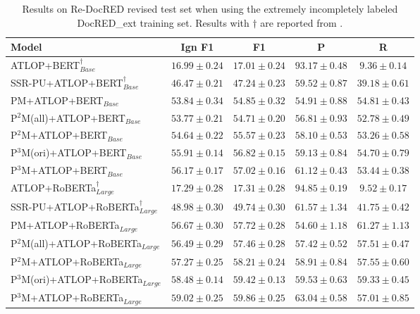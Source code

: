 \documentclass[11pt]{article}
\begin{document}
\begin{table}%
\centering
\small
\begin{tabular}{lcccc}
\toprule \textbf{Model} & Ign F1 & F1 & P & R \\
\midrule ATLOP+BERT$_{Base}^{\dagger}$ & $16.99 \pm 0.24$ & $17.01 \pm 0.24$ & $\mathbf{93.17} \pm \mathbf{0.48}$ & $9.36 \pm 0.14$ \\
SSR-PU+ATLOP+BERT$_{Base}^{\dagger}$ & $46.47 \pm 0.21$ & $47.24 \pm 0.23$ & $59.52 \pm 0.87$ & $39.18 \pm 0.61$ \\
PM+ATLOP+BERT$_{Base}$ & $53.84 \pm 0.34$ & $54.85 \pm 0.32$ & $54.91 \pm 0.88$ & $\mathbf{54.81} \pm \mathbf{0.43}$ \\
P$^{2}$M(all)+ATLOP+BERT$_{Base}$ & $53.77 \pm 0.21$ & $54.71 \pm 0.20$ & $56.81 \pm 0.93$ & $52.78 \pm 0.49$ \\
P$^{2}$M+ATLOP+BERT$_{Base}$ & $54.64 \pm 0.22$ & $55.57 \pm 0.23$ & $58.10 \pm 0.53$ & $53.26 \pm 0.58$ \\
P$^{3}$M(ori)+ATLOP+BERT$_{Base}$ & $55.91 \pm 0.14$ & $56.82 \pm 0.15$ & $59.13 \pm 0.84$ & $54.70 \pm 0.79$ \\
P$^{3}$M+ATLOP+BERT$_{Base}$ & $\mathbf{56.17} \pm \mathbf{0.17}$ & $\mathbf{57.02} \pm \mathbf{0.16}$ & $61.12 \pm 0.43$ & $53.44 \pm 0.38$ \\
\midrule ATLOP+RoBERTa$_{Large}^{\dagger}$ & $17.29 \pm 0.28$ & $17.31 \pm 0.28$ & $\mathbf{94.85} \pm \mathbf{0.19}$ & $9.52 \pm 0.17$ \\
SSR-PU+ATLOP+RoBERTa$_{Large}^{\dagger}$ & $48.98 \pm 0.30$ & $49.74 \pm 0.30$ & $61.57 \pm 1.34$ & $41.75 \pm 0.42$ \\
PM+ATLOP+RoBERTa$_{Large}$ & $56.67 \pm 0.30$ & $57.72 \pm 0.28$ & $54.60 \pm 1.18$ & $\mathbf{61.27} \pm \mathbf{1.13}$ \\
P$^{2}$M(all)+ATLOP+RoBERTa$_{Large}$ & $56.49 \pm 0.29$ & $57.46 \pm 0.28$ & $57.42 \pm 0.52$ & $57.51 \pm 0.47$ \\
P$^{2}$M+ATLOP+RoBERTa$_{Large}$ & $57.27 \pm 0.25$ & $58.21 \pm 0.24$ & $58.91 \pm 0.84$ & $57.55 \pm 0.60$ \\
P$^{3}$M(ori)+ATLOP+RoBERTa$_{Large}$ & $58.48 \pm 0.14$ & $59.42 \pm 0.13$ & $59.53 \pm 0.63$ & $59.33 \pm 0.45$ \\
P$^{3}$M+ATLOP+RoBERTa$_{Large}$ & $\mathbf{59.02} \pm \mathbf{0.25}$ & $\mathbf{59.86} \pm \mathbf{0.25}$ & $63.04 \pm 0.58$ & $57.01 \pm 0.85$ \\
\bottomrule
\end{tabular}
\caption{\label{tab7}
Results on Re-DocRED revised test set when using the extremely incompletely labeled DocRED\_ext training set. Results with $\dagger$ are reported from \citep{wang2022unified}.
}
\end{table}
\end{document}

